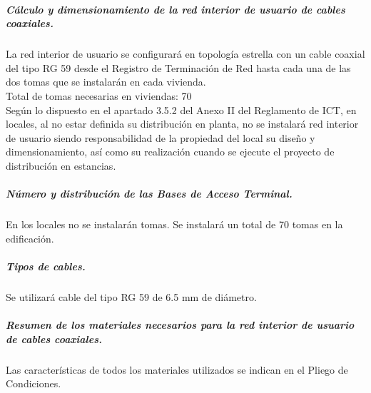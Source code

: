\subparagraph{Cálculo y dimensionamiento de la red interior de usuario de cables coaxiales.}
La red interior de usuario se configurará en topología estrella con un cable coaxial del tipo RG 59 desde el
Registro de Terminación de Red hasta cada una de las dos tomas que se instalarán en cada
vivienda.\\
Total de tomas necesarias en viviendas: 70\\
Según lo dispuesto en el apartado 3.5.2 del Anexo II del Reglamento de ICT, en locales, al no
estar definida su distribución en planta, no se instalará red interior de usuario siendo
responsabilidad de la propiedad del local su diseño y dimensionamiento, así como su realización
cuando se ejecute el proyecto de distribución en estancias.
\subparagraph{Número y distribución de las Bases de Acceso Terminal.}
En los locales no se instalarán tomas.
Se instalará un total de 70 tomas en la edificación.
\subparagraph{Tipos de cables.}
Se utilizará cable del tipo RG 59 de 6.5 mm de diámetro.
\subparagraph{Resumen de los materiales necesarios para la red interior de usuario de cables coaxiales.}
Las características de todos los materiales utilizados se indican en el Pliego de Condiciones.
